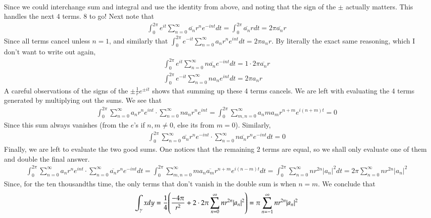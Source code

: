 \documentclass[12pt]{article}
\theoremstyle{definitionstyle}
\begin{document}
\begin{enumerate}[leftmargin=\labelsep]
\begin{align*}
		\end{align*}
		Since we could interchange sum and integral and use the identity from above, and noting that the sign of the $\pm$ actually matters. This handles the next 4 terms. 8 to go! Next note that
		\begin{align*}
			\int_0^{2\pi} e^{it} \sum_{n=0}^\infty \overline{a_n}r^ne^{-int} dt = \int_0^{2\pi} \overline{a_n}rdt = 2\pi \overline{a_n}r
		\end{align*}
		Since all terms cancel unless $n = 1$, and similarly that $\int_0^{2\pi} e^{-it} \sum_{n=0}^\infty a_nr^ne^{int}dt = 2\pi a_nr$. By literally the exact same reasoning, which I don't want to write out again,
		\begin{align*}
			\int_0^{2\pi} e^{it} \sum_{n=0}^\infty n\overline{a_n} e^{-int}dt = 1 \cdot 2\pi \overline{a_n} r \\
			\int_0^{2\pi} e^{-it} \sum_{n=0}^\infty n a_n e^{int}dt = 2 \pi a_n r
		\end{align*}
		A careful observations of the signs of the $\pm\frac1r e^{\pm it}$ shows that summing up these 4 terms cancels. We are left with evaluating the 4 terms generated by multiplying out the sums. We see that
		\begin{align*}
			\int_0^{2\pi} \sum_{n=0}^\infty a_nr^n e^{int} \cdot \sum_{n=0}^\infty na_nr^n e^{int} = \int_0^{2\pi} \sum_{m,n = 0}^\infty a_nma_m r^{n+m} e^{i(n+m)t} = 0
		\end{align*}
		Since this sum always vanishes (from the $e$'s if $n, m \neq 0$, else its from $m = 0$). Similarly,
		\begin{align*}
			\int_0^{2\pi} \sum_{n=0}^\infty \overline{a_n}r^n e^{-int} \cdot \sum_{n=0}^\infty n\overline{a_n}r^n e^{-int}dt = 0
		\end{align*}
		Finally, we are left to evaluate the two good sums. One notices that the remaining 2 terms are equal, so we shall only evaluate one of them and double the final answer.
		\begin{align*}
			\int_0^{2\pi} \sum_{n=0}^\infty a_nr^ne^{int} \cdot \sum_{n=0}^\infty \overline{a_n}r^ne^{-int}dt = \int_0^{2\pi} \sum_{m,n = 0}^\infty m a_n \overline{a_m} r^{n+m}e^{i(n-m)t}dt = \int_0^{2\pi} \sum_{n=0}^\infty nr^{2n}|a_n|^2dt = 2\pi \sum_{n=0}^\infty nr^{2n}|a_n|^2 
		\end{align*}
		Since, for the ten thousandths time, the only terms that don't vanish in the double sum is when $n = m$. We conclude that 
		\begin{align*}
			\int_{\gamma} xdy = \frac14 \qty(\frac{-4\pi}{r^2} + 2 \cdot 2\pi \sum_{n=0}^\infty nr^{2n}|a_n|^2) = \pi\sum_{n=-1}^\infty nr^{2n}|a_n|^2

\end{align*}
\end{enumerate}
\end{document}
